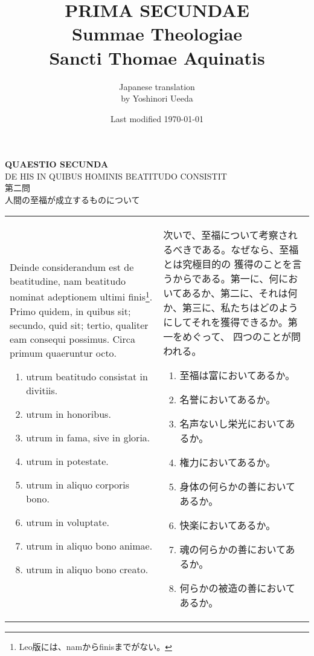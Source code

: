 \documentclass[10pt]{jsarticle} %
\title{{\bf PRIMA SECUNDAE}\\{\HUGE Summae Theologiae}\\Sancti Thomae
Aquinatis}
\author{Japanese translation\\by Yoshinori {\sc Ueeda}}
\date{Last modified \today}
\begin{document}
\maketitle
\pagestyle{fancy}


\begin{center}
 {\Large {\bf QUAESTIO SECUNDA}}\\
 {\large DE HIS IN QUIBUS HOMINIS BEATITUDO CONSISTIT}\\

 {\Large 第二問\\人間の至福が成立するものについて}
\end{center}

\begin{longtable}{p{21em}p{21em}}
Deinde considerandum est de beatitudine, nam beatitudo nominat
 adeptionem ultimi finis\footnote{Leo版には、namからfinisまでがない。}. Primo quidem, in quibus sit; secundo, quid
 sit; tertio, qualiter eam consequi possimus. Circa primum quaeruntur
 octo.

 \begin{enumerate}
  \item utrum beatitudo consistat in divitiis.
  \item utrum in honoribus.
  \item utrum in fama, sive in gloria.
  \item utrum in potestate.
  \item utrum in aliquo corporis bono. 
  \item utrum in voluptate.
  \item utrum in aliquo bono animae.
  \item utrum in aliquo bono creato.
 \end{enumerate}
 

 
&

 次いで、至福について考察されるべきである。なぜなら、至福とは究極目的の
 獲得のことを言うからである。第一に、何においてあるか、第二に、それは何
 か、第三に、私たちはどのようにしてそれを獲得できるか。第一をめぐって、
 四つのことが問われる。
 \begin{enumerate}
  \item 至福は富においてあるか。
  \item 名誉においてあるか。
  \item 名声ないし栄光においてあるか。
  \item 権力においてあるか。
  \item 身体の何らかの善においてあるか。
  \item 快楽においてあるか。
  \item 魂の何らかの善においてあるか。
  \item 何らかの被造の善においてあるか。
 \end{enumerate}

\end{longtable}
\end{document}
